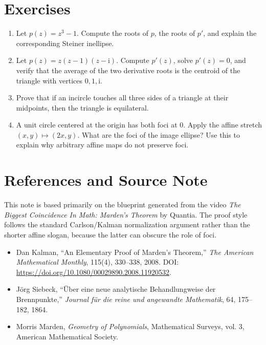 \documentclass[11pt]{article}
\newcommand{\ii}{\mathrm{i}}
\begin{document}
\section{Exercises}

\begin{enumerate}
  \item Let \(p(z)=z^3-1\). Compute the roots of \(p\), the roots of \(p'\), and explain the corresponding Steiner inellipse.

  \item Let \(p(z)=z(z-1)(z-\ii)\). Compute \(p'(z)\), solve \(p'(z)=0\), and verify that the average of the two derivative roots is the centroid of the triangle with vertices \(0,1,\ii\).

  \item Prove that if an incircle touches all three sides of a triangle at their midpoints, then the triangle is equilateral.

  \item A unit circle centered at the origin has both foci at \(0\). Apply the affine stretch \((x,y)\mapsto (2x,y)\). What are the foci of the image ellipse? Use this to explain why arbitrary affine maps do not preserve foci.
\end{enumerate}

\section*{References and Source Note}

This note is based primarily on the blueprint generated from the video \emph{The Biggest Coincidence In Math: Marden's Theorem} by Quantia. The proof style follows the standard Carlson/Kalman normalization argument rather than the shorter affine slogan, because the latter can obscure the role of foci.

\begin{itemize}
  \item Dan Kalman, ``An Elementary Proof of Marden's Theorem,'' \emph{The American Mathematical Monthly}, 115(4), 330--338, 2008. DOI: \url{https://doi.org/10.1080/00029890.2008.11920532}.
  \item J\"org Siebeck, ``\"Uber eine neue analytische Behandlungweise der Brennpunkte,'' \emph{Journal f\"ur die reine und angewandte Mathematik}, 64, 175--182, 1864.
  \item Morris Marden, \emph{Geometry of Polynomials}, Mathematical Surveys, vol. 3, American Mathematical Society.
\end{itemize}
\end{document}
